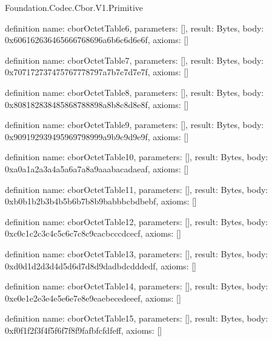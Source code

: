 \begin{lexlean}{Foundation.Codec.Cbor.V1.Primitive}
\begin{semanticmodule}
definition{
  name: cborOctetTable6,
  parameters: [],
  result: Bytes,
  body: 0x606162636465666768696a6b6c6d6e6f,
  axioms: []
}

definition{
  name: cborOctetTable7,
  parameters: [],
  result: Bytes,
  body: 0x707172737475767778797a7b7c7d7e7f,
  axioms: []
}

definition{
  name: cborOctetTable8,
  parameters: [],
  result: Bytes,
  body: 0x808182838485868788898a8b8c8d8e8f,
  axioms: []
}

definition{
  name: cborOctetTable9,
  parameters: [],
  result: Bytes,
  body: 0x909192939495969798999a9b9c9d9e9f,
  axioms: []
}

definition{
  name: cborOctetTable10,
  parameters: [],
  result: Bytes,
  body: 0xa0a1a2a3a4a5a6a7a8a9aaabacadaeaf,
  axioms: []
}

definition{
  name: cborOctetTable11,
  parameters: [],
  result: Bytes,
  body: 0xb0b1b2b3b4b5b6b7b8b9babbbcbdbebf,
  axioms: []
}

definition{
  name: cborOctetTable12,
  parameters: [],
  result: Bytes,
  body: 0xc0c1c2c3c4c5c6c7c8c9cacbcccdcecf,
  axioms: []
}

definition{
  name: cborOctetTable13,
  parameters: [],
  result: Bytes,
  body: 0xd0d1d2d3d4d5d6d7d8d9dadbdcdddedf,
  axioms: []
}

definition{
  name: cborOctetTable14,
  parameters: [],
  result: Bytes,
  body: 0xe0e1e2e3e4e5e6e7e8e9eaebecedeeef,
  axioms: []
}

definition{
  name: cborOctetTable15,
  parameters: [],
  result: Bytes,
  body: 0xf0f1f2f3f4f5f6f7f8f9fafbfcfdfeff,
  axioms: []
}


\end{semanticmodule}
\end{lexlean}
